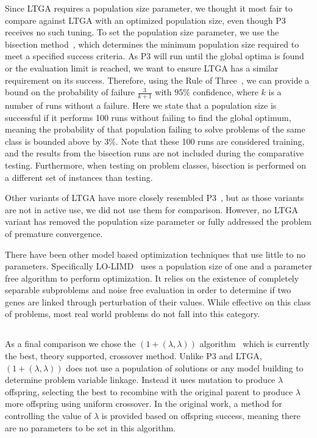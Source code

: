 \documentclass{sig-alternate}
\begin{document}
Since LTGA requires a population size parameter, we thought it most fair to
compare against LTGA with an optimized population size, even though P3
receives no such tuning. To set the population size parameter, we use
the bisection method~\cite{goldman:2012:ltga}, which determines the minimum population
size required to meet a specified success criteria.  As P3 will run until the global optima
is found or the evaluation limit is reached, we want to ensure LTGA has a similar requirement
on its success.  Therefore, using the Rule of Three~\cite{jovanovic:1997:ruleofthree}, we
can provide a bound on the probability of failure $\frac{3}{k+1}$ with $95\%$ confidence,
where $k$ is a number of runs without a failure.  Here we state that a population size
is successful if it performs 100 runs without failing to find the global optimum, meaning
the probability of that population failing to solve problems of the same class is bounded above by
$3\%$.  Note that these 100 runs are considered training, and the results from the bisection
runs are not included during the comparative testing.  Furthermore, when testing on problem
classes, bisection is performed on a different set of instances than testing.

Other variants of LTGA have more closely resembled P3~\cite{goldman:2012:ltga},
but as those variants are not in active use, we did not use them for comparison.
However, no LTGA variant has removed the population size parameter
or fully addressed the problem of premature convergence.

There have been other model based optimization techniques that use little to
no parameters.  Specifically LO-LIMD~\cite{posik:2011:parameterless} uses a
population size of one and a parameter free algorithm to perform optimization.
It relies on the existence of completely separable subproblems and noise free evaluation in order to determine
if two genes are linked through perturbation of their values.  While effective on
this class of problems, most real world problems do not fall into this category.

\subsection{}
As a final comparison we chose the $(1+(\lambda,\lambda))$ algorithm~\cite{doerr:2013:lambdalambda}
which is currently the best, theory supported, crossover method.  Unlike P3 and LTGA,
$(1+(\lambda,\lambda))$ does not use a population of solutions or any model building
to determine problem variable linkage.  Instead it uses mutation to produce $\lambda$
offspring, selecting the best to recombine with the original parent to produce $\lambda$
more offspring using uniform crossover.  In the original work, a method for controlling
the value of $\lambda$ is provided based on offspring success, meaning there are no
parameters to be set in this algorithm.
\end{document}
